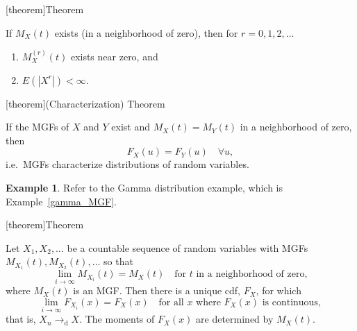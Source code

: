 \documentclass[12pt]{report}
\theoremstyle{definition}
\begin{document}
[theorem]{Theorem}
\begin{existence of MGF}\label{existence_of_MGF}
    If $M_X(t)$ exists (in a neighborhood of zero), then for $r=0,1,2,\ldots$
    \begin{enumerate}[label = (\roman*)]
        \item $M_{X}^{(r)}(t)$ exists near zero, and
        \item $E\left(|X^{r}|\right)<\infty$.
    \end{enumerate} 
\end{existence of MGF}

[theorem]{(Characterization) Theorem}
\begin{characterization of MGF}\label{characterization_of_MGF}
    If the MGFs of $X$ and $Y$ exist and $M_X(t)=M_Y(t)$ in a neighborhood of
    zero, then
    \[
        F_X(u)=F_Y(u)\quad\forall u,
    \]
    i.e.\ MGFs characterize distributions of random variables.
\end{characterization of MGF}
\newtheorem{characterization of MGF eg}[theorem]{Example}
\begin{characterization of MGF eg}
    Refer to the Gamma distribution example, which is Example~\ref{gamma_MGF}.
\end{characterization of MGF eg}

[theorem]{Theorem}
\begin{convergence of MGFs}\label{convergence_of_MGFs}
    Let $X_1,X_2,\ldots$ be a countable sequence of random variables with MGFs
    $M_{X_1}(t),M_{X_2}(t),\ldots$ so that
    \[
        \lim_{i\rightarrow\infty}M_{X_i}(t)=M_X(t)\quad
        \text{for $t$ in a neighborhood of zero},
    \]
    where $M_X(t)$ is an MGF. Then there is a unique cdf, $F_X$, for which
    \[
        \lim_{i\rightarrow\infty}F_{X_i}(x)=F_X(x)\quad
        \text{for all $x$ where $F_X(x)$ is continuous},
    \]
    that is, $X_n\rightarrow_\text{d}X$. The moments of $F_X(x)$ are determined
    by $M_X(t)$.
\end{convergence of MGFs}
\end{document}
